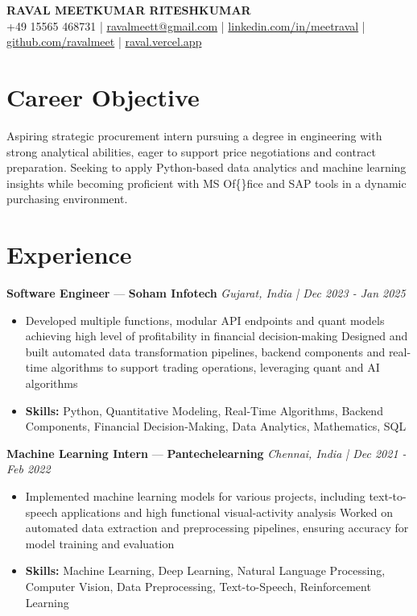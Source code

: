 \documentclass[a4paper,10pt]{article}
\begin{document}
\begin{center}
  {\Large\bfseries RAVAL MEETKUMAR RITESHKUMAR}\\[2pt]
  {\small +49 15565 468731 \;|\; \href{mailto:ravalmeett@gmail.com}{ravalmeett@gmail.com} \;|\; \href{https://www.linkedin.com/in/meetraval/}{linkedin.com/in/meetraval} \;|\; \href{https://github.com/ravalmeet}{github.com/ravalmeet} \;|\; \href{https://raval.vercel.app/}{raval.vercel.app}}
\end{center}
\vspace{-3pt}

\section*{Career Objective}
Aspiring strategic procurement intern pursuing a degree in engineering with strong analytical abilities, eager to support price negotiations and contract preparation. Seeking to apply Python-based data analytics and machine learning insights while becoming proficient with MS Of\{\}fice and SAP tools in a dynamic purchasing environment.\par

\section*{Experience}
\textbf{Software Engineer} — \textbf{Soham Infotech} \hfill \textit{Gujarat, India \;|\; Dec 2023 - Jan 2025}\par
\vspace{1pt}
\begin{itemize}
  \item Developed multiple functions, modular API endpoints and quant models achieving high level of profitability in financial decision-making Designed and built automated data transformation pipelines, backend components and real-time algorithms to support trading operations, leveraging quant and AI algorithms
  \item \textbf{Skills:} Python, Quantitative Modeling, Real-Time Algorithms, Backend Components, Financial Decision-Making, Data Analytics, Mathematics, SQL
\end{itemize}
\vspace{3pt}
\textbf{Machine Learning Intern} — \textbf{Pantechelearning} \hfill \textit{Chennai, India \;|\; Dec 2021 - Feb 2022}\par
\vspace{1pt}
\begin{itemize}
  \item Implemented machine learning models for various projects, including text-to-speech applications and high functional visual-activity analysis Worked on automated data extraction and preprocessing pipelines, ensuring accuracy for model training and evaluation
  \item \textbf{Skills:} Machine Learning, Deep Learning, Natural Language Processing, Computer Vision, Data Preprocessing, Text-to-Speech, Reinforcement Learning
\end{itemize}
\end{document}
